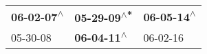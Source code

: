 \begin{supertabular}{lll}
 \textbf{06-02-07\textsuperscript{$\wedge$}} &  \textbf{05-29-09\textsuperscript{$\wedge$*}} &  \textbf{06-05-14\textsuperscript{$\wedge$}} \\
                  05-30-08\textsuperscript{} &   \textbf{06-04-11\textsuperscript{$\wedge$}} &                   06-02-16\textsuperscript{} \\
\end{supertabular}
